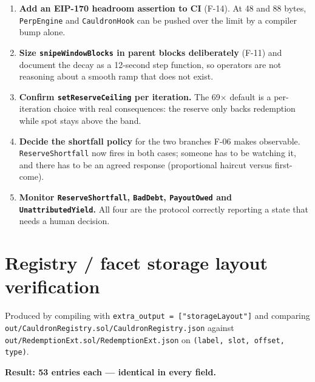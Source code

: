 \documentclass[11pt,a4paper]{article}
\newcommand{\code}[1]{\texttt{\small #1}}
\begin{document}
\begin{enumerate}[leftmargin=2em]
\item \textbf{Add an EIP-170 headroom assertion to CI} (F-14). At 48 and 88 bytes,
\code{PerpEngine} and \code{CauldronHook} can be pushed over the limit by a
compiler bump alone.

\item \textbf{Size \code{snipeWindowBlocks} in parent blocks deliberately}
(F-11) and document the decay as a 12-second step function, so operators are not
reasoning about a smooth ramp that does not exist.

\item \textbf{Confirm \code{setReserveCeiling} per iteration.} The 69$\times$
default is a per-iteration choice with real consequences: the reserve only backs
redemption while spot stays above the band.

\item \textbf{Decide the shortfall policy} for the two branches F-06 makes
observable. \code{ReserveShortfall} now fires in both cases; someone has to be
watching it, and there has to be an agreed response (proportional haircut versus
first-come).

\item \textbf{Monitor \code{ReserveShortfall}, \code{BadDebt},
\code{PayoutOwed} and \code{UnattributedYield}.} All four are the protocol
correctly reporting a state that needs a human decision.
\end{enumerate}

\newpage
\appendix
\section{Registry / facet storage layout verification}
\label{sec:layout}

Produced by compiling with \code{extra\_output = ["storageLayout"]} and comparing
\code{out/CauldronRegistry.sol/CauldronRegistry.json} against
\code{out/RedemptionExt.sol/RedemptionExt.json} on \code{(label, slot, offset,
type)}.

\begin{center}
\textbf{Result: 53 entries each --- identical in every field.}
\end{center}
\end{document}
